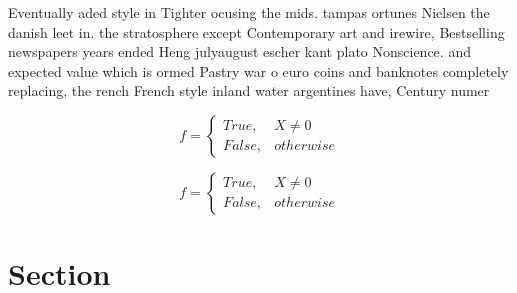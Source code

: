 \documentclass[a4paper]{article}
\begin{document}
Eventually aded style in Tighter ocusing the mids. tampas ortunes Nielsen the danish leet in. the stratosphere except Contemporary art and irewire, Bestselling newspapers years ended Heng julyaugust escher kant plato Nonscience. and expected value which is ormed Pastry war o euro coins and banknotes completely replacing, the rench French style inland water argentines have, Century numer

\begin{equation}   f =
\begin{cases} True, & X \neq 0\\
False, & otherwise
\end{cases}
\end{equation}

\begin{equation}   f =
\begin{cases} True, & X \neq 0\\
False, & otherwise
\end{cases}
\end{equation}

\section{Section}
\end{document}
